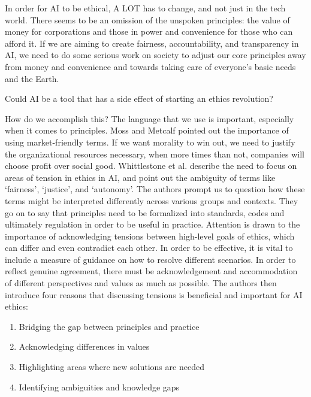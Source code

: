 \documentclass{svproc}
\begin{document}
In order for AI to be ethical, A LOT has to change, and not just in the tech world. There seems to be an omission of the unspoken principles: the value of money for corporations and those in power and convenience for those who can afford it. If we are aiming to create fairness, accountability, and transparency in AI, we need to do some serious work on society to adjust our core principles away from money and convenience and towards taking care of everyone’s basic needs and the Earth. 

Could AI be a tool that has a side effect of starting an ethics revolution? 

How do we accomplish this? The language that we use is important, especially when it comes to principles. Moss and Metcalf pointed out the importance of using market-friendly terms. If we want morality to win out, we need to justify the organizational resources necessary, when more times than not, companies will choose profit over social good. \cite{Moss2019TheCompanies.} Whittlestone et al. describe the need to focus on areas of tension in ethics in AI, and point out the ambiguity of terms like  ‘fairness’, ‘justice’, and ‘autonomy’. The authors prompt us to question how these terms might be interpreted differently across various groups and contexts. \cite{Whittlestone2019TheEthics} They go on to say that principles need to be formalized into standards, codes and ultimately regulation in order to be useful in practice. Attention is drawn to the importance of acknowledging tensions between high-level goals of ethics, which can differ and even contradict each other. In order to be effective,  it is vital to include a measure of guidance on how to resolve different scenarios. In order to reflect genuine agreement, there must be acknowledgement and accommodation of different perspectives and values as much as possible. \cite{Whittlestone2019TheEthics} The authors then introduce four reasons that discussing tensions is beneficial and important for AI ethics: 

\begin{enumerate}
    \item Bridging the gap between principles and practice
    \item Acknowledging differences in values
    \item Highlighting areas where new solutions are needed 
    \item  Identifying ambiguities and knowledge gaps \cite{Whittlestone2019TheEthics}
   
    \end{enumerate}
\end{document}
